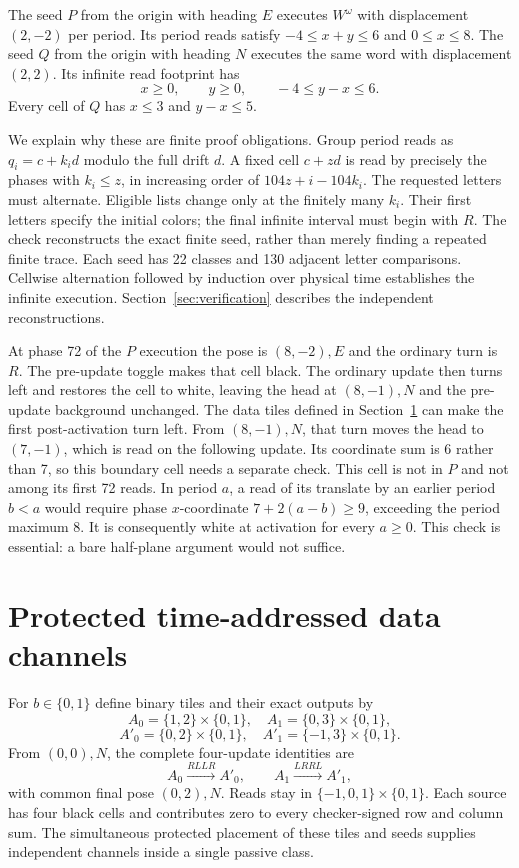 \documentclass[11pt]{article}
\theoremstyle{definition}\newtheorem{definition}[theorem]{Definition}
\begin{document}
The seed $P$ from the origin with heading $E$ executes $W^\omega$ with displacement $(2,-2)$
per period. Its period reads satisfy $-4\le x+y\le6$ and $0\le x\le8$.
The seed $Q$ from the origin with heading $N$ executes the same word with displacement $(2,2)$.
Its infinite read footprint has
\begin{equation}\label{eq:outguard}
x\ge0,\qquad y\ge0,\qquad -4\le y-x\le6.
\end{equation}
Every cell of $Q$ has $x\le3$ and $y-x\le5$.

We explain why these are finite proof obligations. Group period reads as
$q_i=c+k_i d$ modulo the full drift $d$. A fixed cell $c+z d$ is read by precisely
the phases with $k_i\le z$, in increasing order of $104z+i-104k_i$. The requested
letters must alternate. Eligible lists change only at the finitely many $k_i$.
Their first letters specify the initial colors; the final infinite interval
must begin with $R$. The check reconstructs the exact finite seed, rather than
merely finding a repeated finite trace. Each seed has 22 classes and 130 adjacent
letter comparisons. Cellwise alternation followed by induction over physical
time establishes the infinite execution. Section~\ref{sec:verification} describes
the independent reconstructions.

At phase 72 of the $P$ execution the pose is $(8,-2),E$ and the ordinary turn is
$R$. The pre-update toggle makes that cell black. The ordinary update then turns
left and restores the cell to white, leaving the head at $(8,-1),N$ and the
pre-update background unchanged.
The data tiles defined in Section~\ref{sec:channels} can make the first
post-activation turn left. From $(8,-1),N$, that turn moves the head to
$(7,-1)$, which is read on the following update. Its coordinate sum is 6
rather than 7, so this boundary cell needs a separate check. This cell is not in $P$ and
not among its first 72 reads. In period $a$, a read of its translate by an earlier
period $b<a$ would require phase $x$-coordinate $7+2(a-b)\ge9$, exceeding the
period maximum 8. It is consequently white at activation for every $a\ge0$.
This check is essential: a bare half-plane argument would not suffice.

\section{Protected time-addressed data channels}\label{sec:channels}
For $b\in\{0,1\}$ define binary tiles and their exact outputs by
\[
A_0=\{1,2\}\times\{0,1\},\quad A_1=\{0,3\}\times\{0,1\},
\]
\[
A'_0=\{0,2\}\times\{0,1\},\quad A'_1=\{-1,3\}\times\{0,1\}.
\]
From $(0,0),N$, the complete four-update identities are
\begin{equation}\label{eq:tiles}
A_0\xrightarrow{RLLR}A'_0,\qquad
A_1\xrightarrow{LRRL}A'_1,
\end{equation}
with common final pose $(0,2),N$. Reads stay in
$\{-1,0,1\}\times\{0,1\}$. Each source has four black cells and contributes
zero to every checker-signed row and column sum. The simultaneous protected placement of these tiles and seeds supplies
independent channels inside a single passive class.
\end{document}
